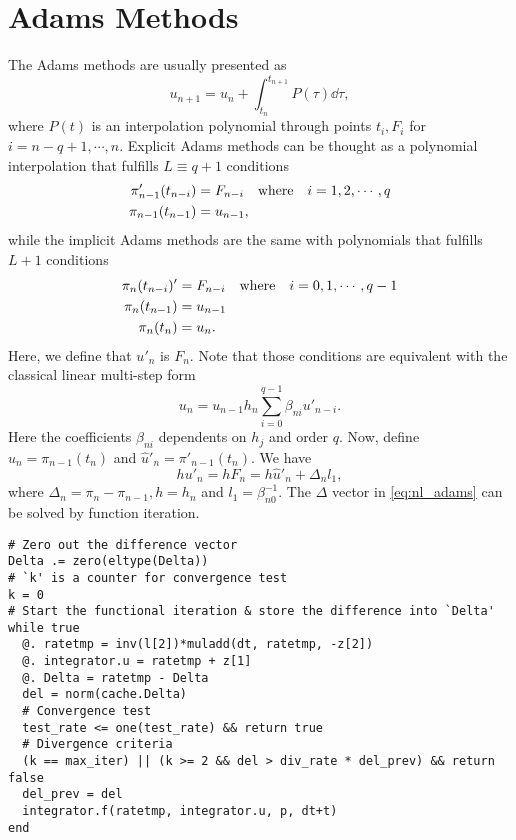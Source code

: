 \documentclass[11pt,a4paper]{article}
\begin{document}
\section{Adams Methods} \label{sec:adams}
The Adams methods are usually presented as
\begin{equation} \label{eq:Adams_int}
  u_{n+1} = u_n + \int_{t_n}^{t_{n+1}} P(\tau) \dd{\tau},
\end{equation}
where $P(t)$ is an interpolation polynomial through points $t_i, F_i$ for
$i=n-q+1,\cdots,n$.
Explicit Adams methods can be thought as a polynomial interpolation that
fulfills $L\equiv q+1$ conditions
\begin{align} \label{eq:adams1}
  \pi_{n-1}'(t_{n-i})&=F_{n-i}\qq{where} i=1,2,\cdots,q \\
  \pi_{n-1}(t_{n-1})&=u_{n-1},
\end{align}
while the implicit Adams methods are the same with polynomials that fulfills
$L+1$ conditions
\begin{align} \label{eq:adams2}
  \pi_{n}(t_{n-i})'&=F_{n-i}\qq{where} i=0,1,\cdots,q-1 \\
  \pi_{n}(t_{n-1})&=u_{n-1} \\
  \pi_{n}(t_{n})&=u_{n}.
\end{align}
Here, we define that $u'_n$ is $F_n$. Note that those conditions are equivalent
with the classical linear multi-step form
\begin{equation}
  u_n = u_{n-1} h_n\sum_{i=0}^{q-1}\beta_{ni}u'_{n-i}.
\end{equation}
Here the coefficients $\beta_{ni}$ dependents on $h_j$ and order $q$. Now,
define $\hat{u}_n = \pi_{n-1}(t_n)$ and $\hat{u}'_n = \pi'_{n-1}(t_n)$. We have
\begin{equation} \label{eq:nl_adams}
  hu'_n = hF_n = h\hat{u}'_n + \Delta_n l_1,
\end{equation}
where $\Delta_n = \pi_n - \pi_{n-1}, h=h_n$ and $l_1 =
\beta_{n0}^{-1}$. The $\Delta$ vector in \cref{eq:nl_adams} can be solved by
function iteration.
\begin{lstlisting}
# Zero out the difference vector
Delta .= zero(eltype(Delta))
# `k' is a counter for convergence test
k = 0
# Start the functional iteration & store the difference into `Delta'
while true
  @. ratetmp = inv(l[2])*muladd(dt, ratetmp, -z[2])
  @. integrator.u = ratetmp + z[1]
  @. Delta = ratetmp - Delta
  del = norm(cache.Delta)
  # Convergence test
  test_rate <= one(test_rate) && return true
  # Divergence criteria
  (k == max_iter) || (k >= 2 && del > div_rate * del_prev) && return false
  del_prev = del
  integrator.f(ratetmp, integrator.u, p, dt+t)
end
\end{lstlisting}
\end{document}
